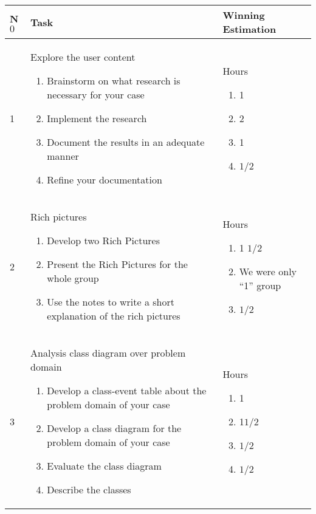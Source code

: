 \begin{center}
	\def\arraystretch{1.5}%
    \begin{tabular}{ | l |  p{5cm} | p{5cm} |}
    \hline
	\textbf{N$0$} & \textbf{Task} & \textbf{Winning Estimation}\\ \hline
	1 & Explore the user content \begin{enumerate}
		\item Brainstorm on what research is necessary for your case
		\item Implement the research
		\item Document the results in an adequate manner
		\item Refine your documentation
	\end{enumerate}  & Hours \begin{enumerate}
		\item 1
		\item 2
		\item 1
		\item $1/2$
	\end{enumerate} \\ \hline
	2 & Rich pictures \begin{enumerate}
		\item Develop two Rich Pictures
		\item Present the Rich Pictures for the whole group
		\item Use the notes to write a short explanation of the rich pictures
	\end{enumerate} & Hours \begin{enumerate}
		\item 1 $1/2$
		\item We were only “1” group
		\item $1/2$
	\end{enumerate} \\ \hline
	
	3 & Analysis class diagram over problem domain \begin{enumerate}
		\item Develop a class-event table about the problem domain of your case  
		\item Develop a class diagram for the problem domain of your case
		\item Evaluate the class diagram
		\item Describe the classes
	\end{enumerate} & Hours \begin{enumerate}
		\item 1
		\item 1$1/2$
		\item $1/2$
		\item $1/2$
	\end{enumerate}\\ \hline
	

\end{tabular}
\end{center}
